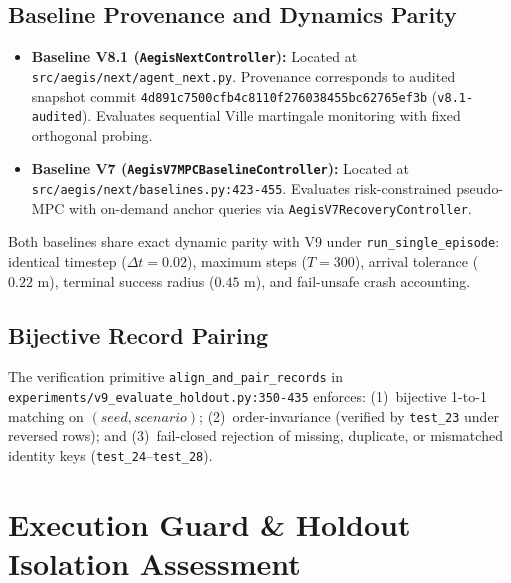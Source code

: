 \documentclass[10pt,a4paper]{article}
\begin{document}
\subsection{Baseline Provenance and Dynamics Parity}
\begin{itemize}
    \item \textbf{Baseline V8.1 (\texttt{AegisNextController}):} Located at \texttt{src/aegis/next/agent\_next.py}. Provenance corresponds to audited snapshot commit \texttt{4d891c7500cfb4c8110f276038455bc62765ef3b} (\texttt{v8.1-audited}). Evaluates sequential Ville martingale monitoring with fixed orthogonal probing.
    \item \textbf{Baseline V7 (\texttt{AegisV7MPCBaselineController}):} Located at \texttt{src/aegis/next/baselines.py:423-455}. Evaluates risk-constrained pseudo-MPC with on-demand anchor queries via \texttt{AegisV7RecoveryController}.
\end{itemize}
Both baselines share exact dynamic parity with V9 under \texttt{run\_single\_episode}: identical timestep ($\Delta t = 0.02$), maximum steps ($T=300$), arrival tolerance ($0.22\text{ m}$), terminal success radius ($0.45\text{ m}$), and fail-unsafe crash accounting.

\subsection{Bijective Record Pairing}
The verification primitive \texttt{align\_and\_pair\_records} in \texttt{experiments/v9\_evaluate\_holdout.py:350-435} enforces:
(1)~bijective 1-to-1 matching on $(seed, scenario)$; (2)~order-invariance (verified by \texttt{test\_23} under reversed rows); and (3)~fail-closed rejection of missing, duplicate, or mismatched identity keys (\texttt{test\_24}--\texttt{test\_28}).

\section{Execution Guard \& Holdout Isolation Assessment}
\end{document}
